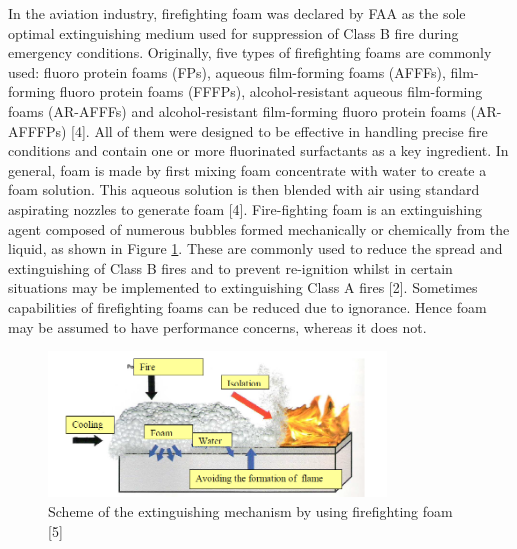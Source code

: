 \documentclass[12pt]{report}
\begin{document}
In the aviation industry, firefighting foam was declared by FAA as the sole optimal extinguishing medium used for suppression of Class B fire during emergency conditions. Originally, five types of firefighting foams are commonly used: fluoro protein foams (FPs), aqueous film-forming foams (AFFFs), film-forming fluoro protein foams (FFFPs), alcohol-resistant aqueous film-forming foams (AR-AFFFs) and alcohol-resistant film-forming fluoro protein foams (AR-AFFFPs) [4]. All of them were designed to be effective in handling precise fire conditions and contain one or more fluorinated surfactants as a key ingredient.
In general, foam is made by first mixing foam concentrate with water to create a foam solution. This aqueous solution is then blended with air using standard aspirating nozzles to generate foam [4].  Fire-fighting foam is an extinguishing agent composed of numerous bubbles formed mechanically or chemically from the liquid, as shown in Figure \ref{ch2:figure:scheme}. These are commonly used to reduce the spread and extinguishing of Class B fires and to prevent re-ignition whilst in certain situations may be implemented to extinguishing Class A fires [2]. Sometimes capabilities of firefighting foams can be reduced due to ignorance. Hence foam may be assumed to have performance concerns, whereas it does not. 

\begin{figure}[H]
    \centering
    \includegraphics[width=0.8\textwidth]{extinguishing_mechanism_scheme.png}
    \caption{Scheme of the extinguishing mechanism by using firefighting foam [5]}
    \label{ch2:figure:scheme}
\end{figure}
\end{document}
